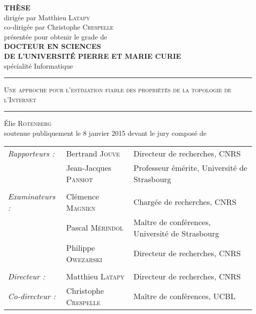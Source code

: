 \begin{center}
\Large
\textbf{THÈSE}\\
\bigskip
\normalsize
dirigée par Matthieu \textsc{Latapy}\\
co-dirigée par Christophe \textsc{Crespelle}\\
\bigskip
présentée pour obtenir le grade de \\
\bigskip
\large
\textbf{DOCTEUR EN SCIENCES \\ DE L'UNIVERSITÉ PIERRE ET MARIE CURIE}\\
\medskip
\large
{spécialité Informatique}\\
\vfill
{\color{darkred} \rule{0.9\textwidth}{0.5mm}}
\begin{minipage}[c]{.96\textwidth}
	\begin{center}
	\vspace*{8mm}
	\Large
	\textsc{
	Une approche pour l'estimation fiable des propriétés de la topologie de
	l'Internet
	}
	\vspace*{8mm}
	\end{center}
\end{minipage}
{\color{darkred} \rule{0.98\textwidth}{0.5mm} }
\vfill
{\Large \'Elie \textsc{Rotenberg}\\}
\bigskip
\vfill
\normalsize
\noindent soutenue publiquement le 8 janvier 2015 devant le jury composé de~\\
\bigskip
\begin{tabular}{lll}
\textit{Rapporteurs :}  
& Bertrand \textsc{Jouve} 		& Directeur de recherches, CNRS\\
& Jean-Jacques \textsc{Pansiot} & Professeur émérite, Université de Strasbourg\\
\\
\textit{Examinateurs :}
& Clémence \textsc{Magnien}		& Chargée de recherches, CNRS\\
& Pascal \textsc{Mérindol}		& Maître de conférences, Université de Strasbourg\\
& Philippe \textsc{Owezarski}	& Directeur de recherches, CNRS\\
\\
\textit{Directeur :}	  		
& Matthieu \textsc{Latapy}		& Directeur de recherches, CNRS\\
\textit{Co-directeur :} 	
& Christophe \textsc{Crespelle} & Maître de conférences, UCBL\\
\end{tabular}
\end{center}


\addtolength{\oddsidemargin}{5mm}
\addtolength{\textwidth}{-3mm}
\addtolength{\topmargin}{19mm}
